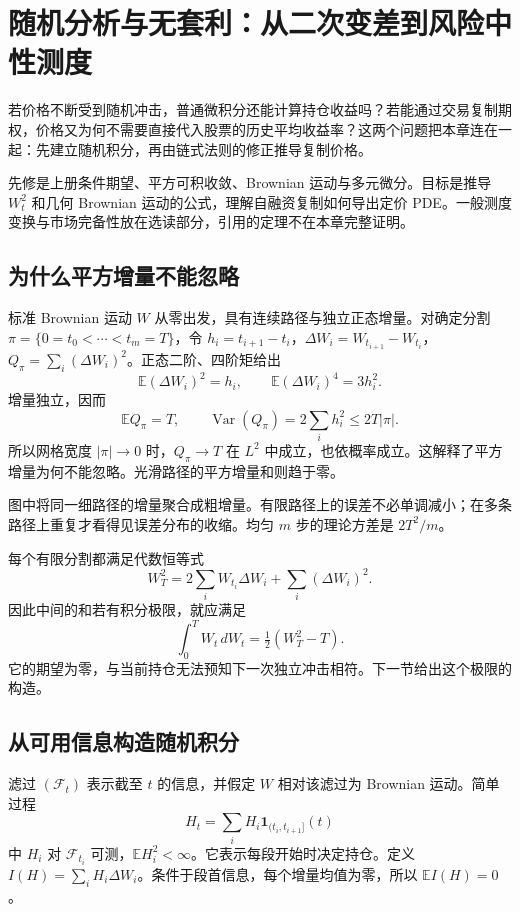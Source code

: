 \chapter{随机分析与无套利：从二次变差到风险中性测度}
\label{ch:lower-derivatives-stochastic}

若价格不断受到随机冲击，普通微积分还能计算持仓收益吗？若能通过交易复制期权，价格又为何不需要直接代入股票的历史平均收益率？这两个问题把本章连在一起：先建立随机积分，再由链式法则的修正推导复制价格。

先修是上册条件期望、平方可积收敛、Brownian 运动与多元微分。目标是推导 $W_t^2$ 和几何 Brownian 运动的公式，理解自融资复制如何导出定价 PDE。一般测度变换与市场完备性放在选读部分，引用的定理不在本章完整证明。



\section{为什么平方增量不能忽略}
标准 Brownian 运动 $W$ 从零出发，具有连续路径与独立正态增量。对确定分割 $\pi=\{0=t_0<\cdots<t_m=T\}$，令 $h_i=t_{i+1}-t_i$，$\Delta W_i=W_{t_{i+1}}-W_{t_i}$，$Q_\pi=\sum_i(\Delta W_i)^2$。正态二阶、四阶矩给出
\[
\mathbb E(\Delta W_i)^2=h_i,\qquad \mathbb E(\Delta W_i)^4=3h_i^2.
\]
增量独立，因而
\[
\mathbb E Q_\pi=T,\qquad \operatorname{Var}(Q_\pi)=2\sum_i h_i^2\le2T|\pi|.
\]
所以网格宽度 $|\pi|\to0$ 时，$Q_\pi\to T$ 在 $L^2$ 中成立，也依概率成立。这解释了平方增量为何不能忽略。光滑路径的平方增量和则趋于零。


图中将同一细路径的增量聚合成粗增量。有限路径上的误差不必单调减小；在多条路径上重复才看得见误差分布的收缩。均匀 $m$ 步的理论方差是 $2T^2/m$。

每个有限分割都满足代数恒等式
\[
W_T^2=2\sum_iW_{t_i}\Delta W_i+\sum_i(\Delta W_i)^2.
\]
因此中间的和若有积分极限，就应满足
\[
\int_0^TW_t\,dW_t=\tfrac12(W_T^2-T).
\]
它的期望为零，与当前持仓无法预知下一次独立冲击相符。下一节给出这个极限的构造。

\section{从可用信息构造随机积分}
滤过 $(\mathcal F_t)$ 表示截至 $t$ 的信息，并假定 $W$ 相对该滤过为 Brownian 运动。简单过程
\[
H_t=\sum_iH_i\mathbf1_{(t_i,t_{i+1}]}(t)
\]
中 $H_i$ 对 $\mathcal F_{t_i}$ 可测，$\mathbb EH_i^2<\infty$。它表示每段开始时决定持仓。定义 $I(H)=\sum_iH_i\Delta W_i$。条件于段首信息，每个增量均值为零，所以 $\mathbb EI(H)=0$。

